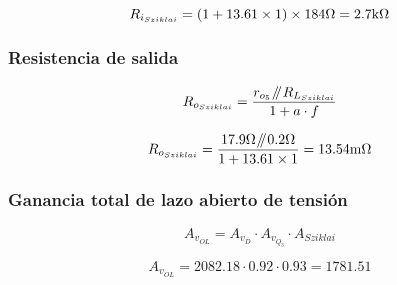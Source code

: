 \begin{equation*}
R_{i_{Sziklai}} = \left( 1 + 13.61 \times 1 \right) \times 184  \si[per-mode=symbol]{\ohm} = 2.7 \si[per-mode=symbol]{\kilo\ohm}
\end{equation*}



\subsubsection{Resistencia de salida}

\begin{equation}
R_{o_{Sziklai}} = \frac{ r_{o_{5}} \parallelresistors R_{L_{Sziklai}}  }{1 + a \cdot f}
\end{equation}

\begin{equation*}
R_{o_{Sziklai}} = \frac{ 17.9 \si[per-mode=symbol]{\ohm} \parallelresistors 0.2 \si[per-mode=symbol]{\ohm}  }{  1 + 13.61 \times 1 } = 13.54 \si[per-mode=symbol]{\milli\ohm}
\end{equation*}


\subsubsection{Ganancia total de lazo abierto de tensión}

\begin{equation}
A_{v_{OL}} = A_{v_{D}} \cdot A_{v_{Q_{3}}} \cdot A_{Sziklai}
\end{equation}

\begin{equation*}
A_{v_{OL}} = 2082.18 \cdot 0.92 \cdot 0.93 = 1781.51
\end{equation*}




